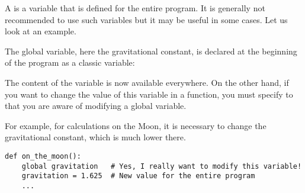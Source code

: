 \documentclass[11pt,class=report,crop=false]{standalone}
\begin{document}


\begin{cours}


A  is a variable that is defined for the entire program. It is generally not recommended to use such variables but it may be useful in some cases. Let us look at an example.

The global variable, here the gravitational constant, is declared at the beginning of the program as a classic variable: 

The content of the variable  is now available everywhere.
On the other hand, if you want to change the value of this variable in a function, you must specify to \Python{} that you are aware of modifying a global variable.

For example, for calculations on the Moon, it is necessary to change the gravitational constant, which is much lower there.

\begin{lstlisting}
def on_the_moon():
    global gravitation   # Yes, I really want to modify this variable!
    gravitation = 1.625  # New value for the entire program
    ...
\end{lstlisting}

\end{cours}


\end{document}
